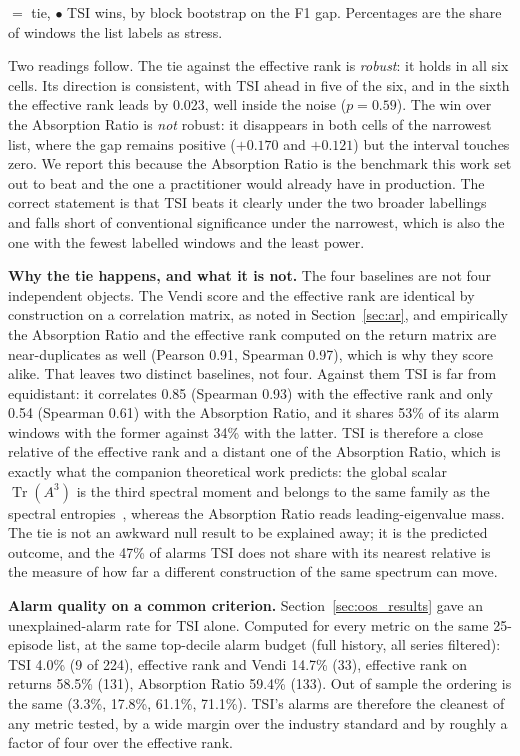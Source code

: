 \documentclass[11pt,a4paper]{article}
\begin{document}
\noindent$=$ tie, $\bullet$ TSI wins, by block bootstrap on the F1 gap.
Percentages are the share of windows the list labels as stress.

Two readings follow. The tie against the effective rank is \emph{robust}: it
holds in all six cells. Its direction is consistent, with TSI ahead in
five of the six, and in the sixth the effective rank leads by 0.023, well
inside the noise ($p = 0.59$). The win over the Absorption Ratio is \emph{not}
robust: it disappears in both cells of the narrowest list, where the gap
remains positive ($+0.170$ and $+0.121$) but the interval touches zero. We
report this because the Absorption Ratio is the benchmark this work set out
to beat and the one a practitioner would already have in production. The
correct statement is that TSI beats it clearly under the two broader
labellings and falls short of conventional significance under the narrowest,
which is also the one with the fewest labelled windows and the least power.

\textbf{Why the tie happens, and what it is not.} The four baselines are not
four independent objects. The Vendi score and the effective rank are
identical by construction on a correlation matrix, as noted in
Section~\ref{sec:ar}, and empirically the Absorption Ratio and the effective
rank computed on the return matrix are near-duplicates as well (Pearson 0.91,
Spearman 0.97), which is why they score alike. That leaves two distinct
baselines, not four. Against them TSI is far from equidistant: it
correlates 0.85 (Spearman 0.93) with the effective rank and only 0.54
(Spearman 0.61) with the Absorption Ratio, and it shares 53\% of its alarm
windows with the former against 34\% with the latter. TSI is therefore a
close relative of the effective rank and a distant one of the Absorption
Ratio, which is exactly what the companion theoretical work predicts: the
global scalar $\operatorname{Tr}(A^3)$ is the third spectral moment and
belongs to the same family as the spectral entropies~\cite{acedo2026fsri},
whereas the Absorption Ratio reads leading-eigenvalue mass. The tie is not an
awkward null result to be explained away; it is the predicted outcome, and the
47\% of alarms TSI does not share with its nearest relative is the
measure of how far a different construction of the same spectrum can move.

\textbf{Alarm quality on a common criterion.} Section~\ref{sec:oos_results}
gave an unexplained-alarm rate for TSI alone. Computed for every metric on
the same 25-episode list, at the same top-decile alarm budget (full history,
all series filtered): TSI 4.0\% (9 of 224), effective rank and Vendi
14.7\% (33), effective rank on returns 58.5\% (131), Absorption Ratio 59.4\%
(133). Out of sample the ordering is the same (3.3\%, 17.8\%, 61.1\%, 71.1\%).
TSI's alarms are therefore the cleanest of any metric tested, by a wide
margin over the industry standard and by roughly a factor of four over the
effective rank.
\end{document}
